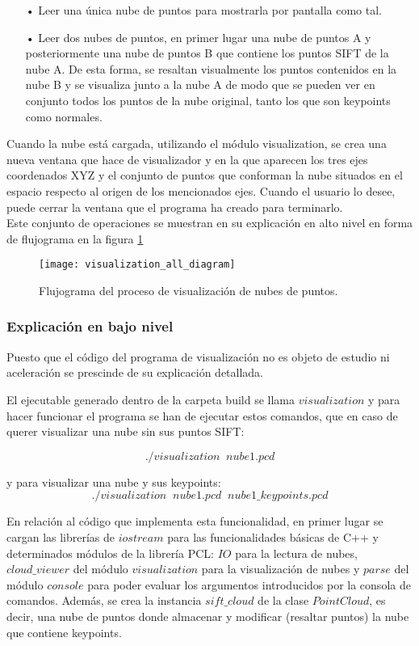 \begin{itemize}
\item[•]Leer una única nube de puntos para mostrarla por pantalla como tal.
\item[•]Leer dos nubes de puntos, en primer lugar una nube de puntos A y posteriormente una nube de puntos B que contiene los puntos SIFT de la nube A. De esta forma, se resaltan visualmente los puntos contenidos en la nube B y se visualiza junto a la nube A de modo que se pueden ver en conjunto todos los puntos de la nube original, tanto los que son keypoints como normales. 
\end{itemize}

Cuando la nube está cargada, utilizando el módulo visualization, se crea una nueva ventana que hace de visualizador y en la que aparecen los tres ejes coordenados XYZ y el conjunto de puntos que conforman la nube situados en el espacio respecto al origen de los mencionados ejes. Cuando el usuario lo desee, puede cerrar la ventana que el programa ha creado para terminarlo.
\\
Este conjunto de operaciones se muestran en su explicación en alto nivel en forma de flujograma en la figura \ref{fig:visualization_all_diagram}

\begin{figure}
\centering
\texttt{[image: visualization\_all\_diagram]}
\caption{Flujograma del proceso de visualización de nubes de puntos.}\label{fig:visualization_all_diagram}
\end{figure}


\subsubsection{Explicación en bajo nivel}
Puesto que el código del programa de visualización no es objeto de estudio ni aceleración se prescinde de su explicación detallada.

\iffalse
El ejecutable generado dentro de la carpeta build se llama $visualization$ y para hacer funcionar el programa se han de ejecutar estos comandos, que en caso de querer visualizar una nube sin sus puntos SIFT:

$$./visualization \;\; nube1.pcd$$

y para visualizar una nube y sus keypoints:
$$./visualization \;\; nube1.pcd \;\; nube1\_keypoints.pcd$$

En relación al código que implementa esta funcionalidad, en primer lugar se cargan las librerías de $iostream$ para las funcionalidades básicas de C++ y determinados módulos de la librería PCL: $IO$ para la lectura de nubes, $cloud\_viewer$ del módulo $visualization$ para la visualización de nubes y $parse$ del módulo $console$ para poder evaluar los argumentos introducidos por la consola de comandos.
Además, se crea la instancia $sift\_cloud$ de la clase $PointCloud$, es decir, una nube de puntos donde almacenar y modificar (resaltar puntos) la nube que contiene keypoints.

